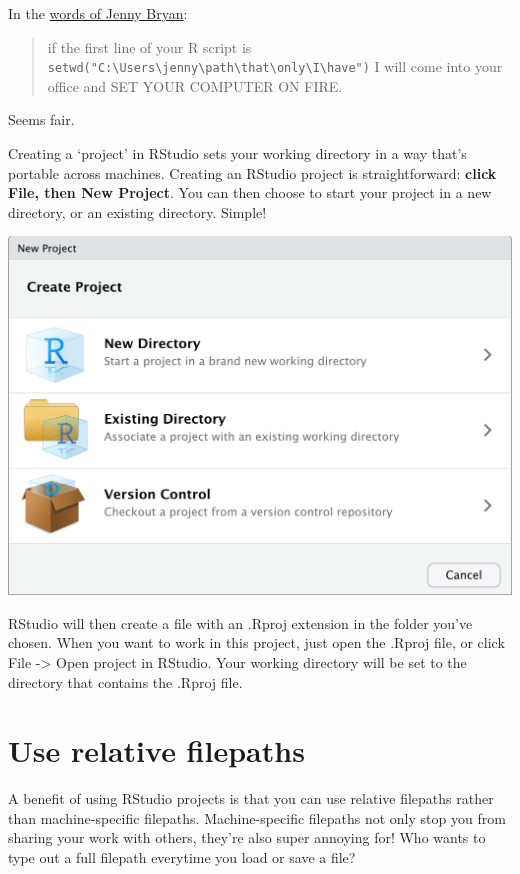 \documentclass[]{book}
\begin{document}
In the \href{https://www.tidyverse.org/articles/2017/12/workflow-vs-script/}{words of Jenny Bryan}:

\begin{quote}
if the first line of your R script is \texttt{setwd("C:\textbackslash{}Users\textbackslash{}jenny\textbackslash{}path\textbackslash{}that\textbackslash{}only\textbackslash{}I\textbackslash{}have")} I will come into your office and SET YOUR COMPUTER ON FIRE.
\end{quote}

Seems fair.

Creating a `project' in RStudio sets your working directory in a way that's portable across machines. Creating an RStudio project is straightforward: \textbf{click File, then New Project}. You can then choose to start your project in a new directory, or an existing directory. Simple!

\begin{center}\includegraphics[width=0.66\linewidth]{atlas/rstudio_newproject} \end{center}

RStudio will then create a file with an .Rproj extension in the folder you've chosen. When you want to work in this project, just open the .Rproj file, or click File -\textgreater{} Open project in RStudio. Your working directory will be set to the directory that contains the .Rproj file.

\hypertarget{use-relative-filepaths}{%
\section{Use relative filepaths}\label{use-relative-filepaths}}

A benefit of using RStudio projects is that you can use relative filepaths rather than machine-specific filepaths.
Machine-specific filepaths not only stop you from sharing your work with others, they're also super annoying for! Who wants to type out a full filepath everytime you load or save a file?
\end{document}
